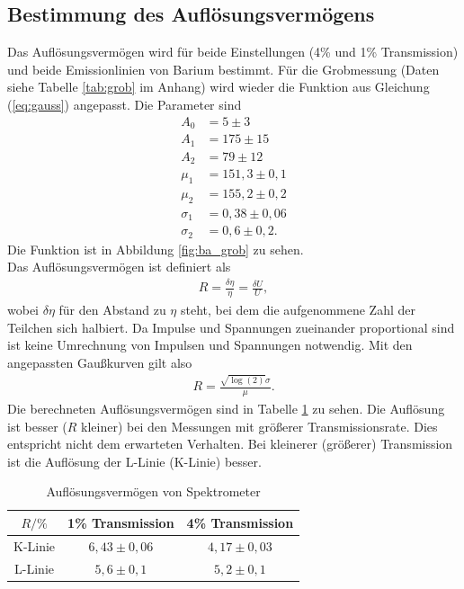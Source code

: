 \subsection{Bestimmung des Auflösungsvermögens}
Das Auflösungsvermögen wird für beide Einstellungen (4\% und 1\% Transmission) und beide Emissionlinien von Barium bestimmt. Für die Grobmessung (Daten siehe Tabelle \ref{tab:grob} im Anhang) wird wieder die Funktion aus Gleichung (\ref{eq:gauss}) angepasst. Die Parameter sind
\begin{align*}
  A_0&=5\pm 3\\
  A_1&=175\pm 15\\
  A_2&=79\pm 12\\
  \mu_1&=151,3 \pm 0,1\\
  \mu_2&=155,2 \pm 0,2\\
  \sigma_1&=0,38 \pm 0,06\\
  \sigma_2&=0,6 \pm 0,2.
\end{align*}
Die Funktion ist in Abbildung \ref{fig:ba_grob} zu sehen.\\

Das Auflösungsvermögen ist definiert als
\begin{align*}
  R=\frac{\delta\eta}{\eta}=\frac{\delta U}{U},
\end{align*}
wobei $\delta\eta$ für den Abstand zu $\eta$ steht, bei dem die aufgenommene Zahl der Teilchen sich halbiert. Da Impulse und Spannungen zueinander proportional sind ist keine Umrechnung von Impulsen und Spannungen notwendig. Mit den angepassten Gaußkurven gilt also 
\begin{align*}
  R=\frac{\sqrt{\log(2)} \sigma}{\mu}.
\end{align*}
Die berechneten Auflösungsvermögen sind in Tabelle \ref{tab:aufloesung} zu sehen. Die Auflösung ist besser ($R$ kleiner) bei den Messungen mit größerer Transmissionsrate. Dies entspricht nicht dem erwarteten Verhalten. Bei kleinerer (größerer) Transmission ist die Auflösung der L-Linie (K-Linie) besser.

\begin{table}[h]
    \centering
    \caption{Auflösungsvermögen von Spektrometer}
    \label{tab:aufloesung}
    \begin{tabular}{c | c c}
      \toprule
       $R/ \%$ & 1\% Transmission & 4\% Transmission \\
      \midrule
      K-Linie & $6,43 \pm 0,06$ & $4,17 \pm 0,03$\\
      L-Linie & $5,6 \pm 0,1$ & $5,2 \pm 0,1$\\
      \bottomrule
    \end{tabular}
  \end{table}

